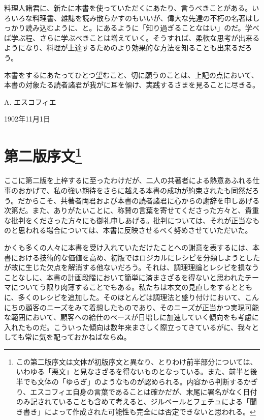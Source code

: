 \begin{Main}
料理人諸君に、新たに本書を使っていただくにあたり、言うべきことがある。いろいろな料理書、雑誌を読み散らかすのもいいが、偉大な先達の不朽の名著はしっかり読み込むように、と。にあるように「知り過ぎることなはい」のだ。学べば学ぶ程、さらに学ぶべきことは増えていく。そうすれば、柔軟な思考が出来るようになり、料理が上達するためのより効果的な方法を知ることも出来るだろう。

本書をするにあたってひとつ望むこと、切に願うのことは、上記の点において、本書の対象たる読者諸君が我がに耳を傾け、実践するさまを見ることに尽きる。\nopagebreak

\begin{flushright}
A. エスコフィエ \nopagebreak
\end{flushright}

1902年11月1日

\newpage

\hypertarget{introduction-deuxieme-edition}{%
\section[第二版序文]{\texorpdfstring{第二版序文\footnote{この第二版序文は文体が初版序文と異なり、とりわけ前半部分については、いわゆる「悪文」と見なさざるを得ないものとなっている。また、前半と後半でも文体の「ゆらぎ」のようなものが認められる。内容から判断するかぎり、エスコフィエ自身の言葉であることは確かだが、末尾に署名がなく日付のみ記されていることも含めて考えると、ジルベールとフェチュによる「聞き書き」によって作成された可能性も完全には否定できないと思われる。}}{第二版序文}}\label{introduction-deuxieme-edition}}

\normalsize
{}
\vspace*{1\zw}

ここに第二版を上梓するに至ったわけだが、二人の共著者による熱意あふれる仕事のおかげで、私の強い期待をさらに越える本書の成功が約束されたも同然だろう。だからこそ、共著者両君および本書の読者諸君に心からの謝辞を申しあげる次第だ。また、ありがたいことに、称賛の言葉を寄せてくださった方々と、貴重な批判をくださった方々にも御礼申しあげる。批判については、それが正当なものと思われる場合については、本書に反映させるべく努めさせていただいた。

かくも多くの人々に本書を受け入れていただけたことへの謝意を表するには、本書における技術的な価値を高め、初版ではロジカルにレシピを分類しようとしたが故に生じた欠点を解消する他ないだろう。それは、調理理論とレシピを損なうことなしに、本書の計画段階において簡単に済まさざるを得ないと思われたテーマについてう限り肉薄することでもある。私たちは本文の見直しをするとともに、多くのレシピを追加した。そのほとんどは調理法と盛り付けにおいて、こんにちの顧客のニーズをみて着想したものであり、そのニーズが正当かつ実現可能な範囲において、顧客への給仕のペースが日増しに加速していく傾向をも考慮に入れたものだ。こういった傾向は数年来まさしく際立ってきているがに、我々としても常に気を配っておかねばならぬ。


\end{Main}
